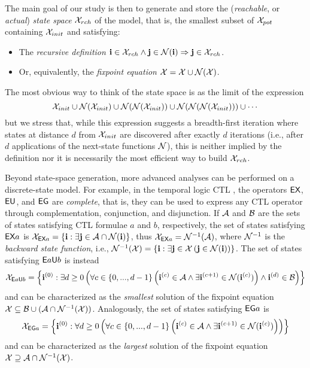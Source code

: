 \documentclass[copyright,creativecommons]{eptcs}
\newcommand{\THEN}{\Rightarrow}                     \newcommand{\IFF}{\Leftrightarrow}                  \newcommand{\IDENT}{\equiv}                         \newcommand{\EQDEF}{=_{\mathrm{df}}}
\renewcommand{\EQDEF}{\stackrel{\mbox{\tiny{def}}}{=}}
\renewcommand{\potxset}{\xset_{pot}}    \renewcommand{\initstate}{\vi_{init}}
\begin{document}
The main goal of our study is then to generate and store the (\emph{reachable},
or \emph{actual}) \emph{state space} $\mathcal{X}_{rch}$ of the model,
that is, the smallest subset of $\potxset$ containing $\mathcal{X}_{init}$
and satisfying:
\begin{itemize}
\item The \emph{recursive definition}
      $\vi \in \xset_{rch} \wedge \vj \in \nset(\vi) \THEN \vj \in \xset_{rch}$.
\item Or, equivalently, the \emph{fixpoint equation}
      $\mathcal{X} = \mathcal{X} \cup \mathcal{N}(\mathcal{X})$.
\end{itemize}
The most obvious way to think of the state space is as the limit of the
expression
$$
 \mathcal{X}_{init}  \cup \mathcal{N}(\mathcal{X}_{init}) \cup \mathcal{N}(\mathcal{N}(\mathcal{X}_{init}))
                \cup \mathcal{N}(\mathcal{N}(\mathcal{N}(\mathcal{X}_{init}))) \cup \cdots
$$
but we stress that, while this expression suggests a breadth-first
iteration where states at distance $d$ from $\mathcal{X}_{init}$ are discovered
after exactly $d$ iterations
(i.e., after $d$ applications of the next-state functions $\mathcal{N}$), this is
neither implied by the definition nor it is necessarily the most efficient
way to build $\mathcal{X}_{rch}$.


Beyond state-space generation, more advanced analyses
can be performed on a discrete-state model.
For example, in the temporal logic CTL
\cite{Clarke1981CTL,McMillan1993Book},
the operators ${\bf\textsf{EX}}$, ${\bf\textsf{EU}}$, and ${\bf\textsf{EG}}$ are \emph{complete},
that is, they can be used to express any CTL operator
through complementation, conjunction, and disjunction.
If $\mathcal{A}$ and $\mathcal{B}$ are the sets of states satisfying CTL
formulae $a$ and $b$, respectively, the set of states satisfying ${\bf\textsf{EX}} a$ is
$\mathcal{X}_{{\bf\textsf{EX}} a} = \{\mathbf{i} : \exists \mathbf{j} \in \mathcal{A} \cap \mathcal{N}(\mathbf{i}) \}$,
thus $\mathcal{X}_{{\bf\textsf{EX}} a} = \mathcal{N}^{-1}(\mathcal{A})$,
where $\mathcal{N}^{-1}$ is the \emph{backward state function}, i.e.,
$\mathcal{N}^{-1} (\mathcal{X}) = \{ \mathbf{i} : \exists \mathbf{j} \in \mathcal{X}
                   \left(\mathbf{j} \in \mathcal{N}(\mathbf{i})\right)\}$.
The set of states satisfying ${\bf\textsf{E}} a {\bf\textsf{U}} b$ is instead
$$
\mathcal{X}_{{\bf\textsf{E}} a {\bf\textsf{U}} b} =
\left\{
   \mathbf{i}^{(0)} :
   \exists d \geq 0 \left(
      \forall c \in \{0,...,d-1\} \left(
         \mathbf{i}^{(c)} \in \mathcal{A} \wedge \exists \mathbf{i}^{(c+1)} \in \mathcal{N}(\mathbf{i}^{(c)})
      \right)
      \wedge
         \mathbf{i}^{(d)} \in \mathcal{B}
   \right)
\right\}
$$
and can be characterized as the
\emph{smallest} solution of the fixpoint equation
$\mathcal{X} \subseteq \mathcal{B} \cup (\mathcal{A} \cap \mathcal{N}^{-1} (\mathcal{X}) )$.
Analogously, the set of states satisfying ${\bf\textsf{EG}} a$ is
$$
\mathcal{X}_{{\bf\textsf{EG}} a} =
\left\{
   \mathbf{i}^{(0)} :
   \forall d \geq 0 \left(
      \forall c \in \{0,...,d-1\} \left(
         \mathbf{i}^{(c)} \in \mathcal{A} \wedge \exists \mathbf{i}^{(c+1)} \in \mathcal{N}(\mathbf{i}^{(c)})
      \right)
    \right)
\right\}
$$
and can be characterized as the \emph{largest}
solution of the fixpoint equation
$\mathcal{X} \supseteq \mathcal{A} \cap \mathcal{N}^{-1} (\mathcal{X})$.
\end{document}
